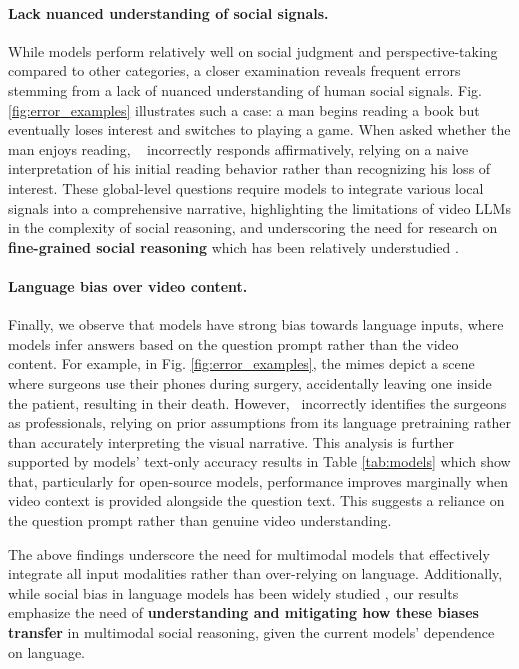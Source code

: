 \paragraph{Lack nuanced understanding of social signals.}
While models perform relatively well on social judgment and perspective-taking compared to other categories, a closer examination reveals frequent errors stemming from a lack of nuanced understanding of human social signals. Fig. \ref{fig:error_examples} illustrates such a case: a man begins reading a book but eventually loses interest and switches to playing a game. When asked whether the man enjoys reading, \gemini~ incorrectly responds affirmatively, relying on a naive interpretation of his initial reading behavior rather than recognizing his loss of interest. These global-level questions require models to integrate various local signals into a comprehensive narrative, highlighting the limitations of video LLMs in the complexity of social reasoning, and underscoring the need for research on \textbf{fine-grained social reasoning} which has been relatively understudied \cite{mathur-etal-2024-advancing}.

\paragraph{Language bias over video content.}
Finally, we observe that models have strong bias towards language inputs, where models infer answers based on the question prompt rather than the video content. For example, in Fig. \ref{fig:error_examples}, the mimes depict a scene where surgeons use their phones during surgery, accidentally leaving one inside the patient, resulting in their death. However, \gemini~incorrectly identifies the surgeons as professionals, relying on prior assumptions from its language pretraining rather than accurately interpreting the visual narrative. This analysis is further supported by models' text-only accuracy results in Table \ref{tab:models} which show that, particularly for open-source models, performance improves marginally when video context is provided alongside the question text. This suggests a reliance on the question prompt rather than genuine video understanding.

The above findings underscore the need for multimodal models that effectively integrate all input modalities rather than over-relying on language. Additionally, while social bias in language models has been widely studied \cite{liang2021towards, gallegos2024bias}, our results emphasize the need of \textbf{understanding and mitigating how these biases transfer} in multimodal social reasoning, given the current models' dependence on language.